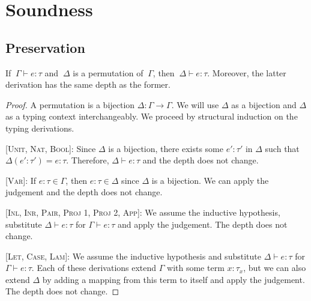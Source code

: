 \documentclass[nonacm]{acmart}
\begin{document}

\section{Soundness}

\subsection{Preservation}


\begin{lemma}[Permutation]
  If \(~\Gamma \vdash e : \tau \) and \(~\Delta \) is a permutation of \(~\Gamma \), then
  \(~\Delta \vdash e : \tau \). Moreover, the latter derivation has the same depth
  as the former.
\end{lemma}

\begin{proof}
  A permutation is a bijection \(\Delta : \Gamma \rightarrow \Gamma \). We will use
  $\Delta$ as a bijection and $\Delta$ as a typing context interchangeably.
  We proceed by structural induction on the typing derivations.

    [\textsc{Unit, Nat, Bool}]: Since $\Delta$ is a bijection, there exists some
  $e' : \tau'$ in $\Delta$ such that \( \Delta(e' : \tau') = e : \tau \). Therefore,
  \(\Delta \vdash e : \tau \) and the depth does not change.

  [\textsc{Var}]: If \(e : \tau \in \Gamma \), then \(e : \tau \in \Delta \) since $\Delta$ is a bijection.
  We can apply the judgement and the depth does not change.

  [\textsc{Inl, Inr, Pair, Proj 1, Proj 2, App}]: We assume the inductive hypothesis, substitute
  $\Delta \vdash e : \tau$ for \( \Gamma \vdash e : \tau \) and apply the judgement.
  The depth does not change.

  [\textsc{Let, Case, Lam}]:  We assume the inductive hypothesis
  and substitute $\Delta \vdash e : \tau$ for \( \Gamma \vdash e : \tau \). Each
  of these derivations extend $\Gamma$ with some term $x : \tau_x$, but we can
  also extend $\Delta$ by adding a mapping from this term to itself and apply the judgement.
  The depth does not change.
\end{proof}
\end{document}
